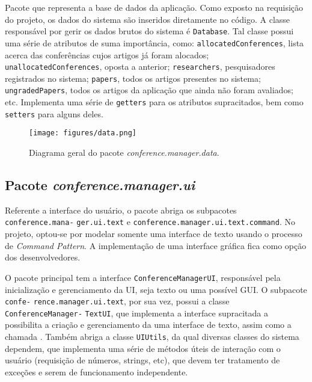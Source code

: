 \documentclass[a4paper, 12pt]{article}
\begin{document}
Pacote que representa a base de dados da aplicação. Como exposto na requisição do projeto, os dados do sistema são inseridos diretamente no código. A classe responsável por gerir os dados brutos do sistema é \verb|Database|. Tal classe possui uma série de atributos de suma importância, como: \verb|allocatedConferences|, lista acerca das conferências cujos artigos já foram alocados; \verb|unallocatedConferences|, oposta a anterior; \verb|researchers|, pesquisadores registrados no sistema; \verb|papers|, todos os artigos presentes no sistema; \verb|ungradedPapers|, todos os artigos da aplicação que ainda não foram avaliados; etc.
Implementa uma série de \verb|getters| para os atributos supracitados, bem como \verb|setters| para alguns deles.

\begin{figure}[h]
\centering
\texttt{[image: figures/data.png]}
\caption{Diagrama geral do pacote \emph{conference.manager.data}.}
\label{fig:data}
\end{figure}

\FloatBarrier

\subsection{Pacote \emph{conference.manager.ui}}

Referente a interface do usuário, o pacote abriga os subpacotes \verb|conference.mana-| \verb|ger.ui.text| e \verb|conference.manager.ui.text.command|. No projeto, optou-se por modelar somente uma interface de texto usando o processo de \emph{Command Pattern}. A implementação de uma interface gráfica fica como opção dos desenvolvedores. 

O pacote principal tem a interface \verb|ConferenceManagerUI|, responsável pela inicialização e gerenciamento da UI, seja texto ou uma possível GUI. O subpacote \verb|confe-| \verb|rence.manager.ui.text|, por sua vez, possui a classe \verb|ConferenceManager-| \verb|TextUI|, que implementa a interface supracitada a possibilita a criação e gerenciamento da uma interface de texto, assim como a chamada . Também abriga a classe \verb|UIUtils|, da qual diversas classes do sistema dependem, que implementa uma série de métodos úteis de interação com o usuário (requisição de números, strings, etc), que devem ter tratamento de exceções e serem de funcionamento independente.
\end{document}
